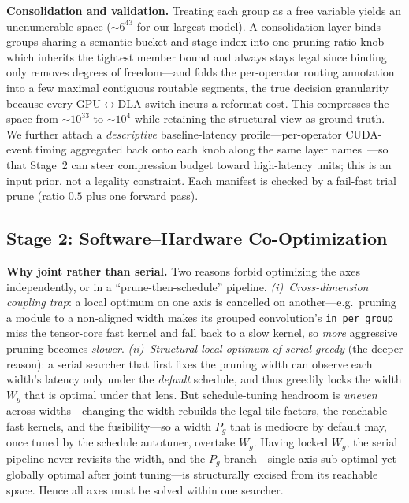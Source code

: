 \documentclass[letterpaper]{article} %
\begin{document}
\noindent\textbf{Consolidation and validation.}
Treating each group as a free variable yields an unenumerable space
($\sim 6^{43}$ for our largest model). A consolidation layer binds groups
sharing a semantic bucket and stage index into one pruning-ratio knob---which
inherits the tightest member bound and always stays legal since binding only
removes degrees of freedom---and folds the per-operator routing annotation
into a few maximal contiguous routable segments, the true decision
granularity because every GPU$\leftrightarrow$DLA switch incurs a reformat
cost. This compresses the space from $\sim 10^{33}$ to $\sim 10^{4}$ while
retaining the structural view as ground truth. We further attach a
\emph{descriptive} baseline-latency profile---per-operator CUDA-event timing
aggregated back onto each knob along the same layer names~\cite{yang2018netadapt}---so
that Stage~2 can steer compression budget toward high-latency units; this is
an input prior, not a legality constraint. Each manifest is checked by a
fail-fast trial prune (ratio $0.5$ plus one forward pass).

\subsection{Stage 2: Software--Hardware Co-Optimization}

\noindent\textbf{Why joint rather than serial.}
Two reasons forbid optimizing the axes independently, or in a
``prune-then-schedule'' pipeline. \emph{(i)~Cross-dimension coupling trap}:
a local optimum on one axis is cancelled on another---e.g.\ pruning a module
to a non-aligned width makes its grouped convolution's
\texttt{in\_per\_group} miss the tensor-core fast kernel and fall back to a
slow kernel, so \emph{more} aggressive pruning becomes \emph{slower}.
\emph{(ii)~Structural local optimum of serial greedy} (the deeper reason):
a serial searcher that first fixes the pruning width can observe each width's
latency only under the \emph{default} schedule, and thus greedily locks the
width $W_g$ that is optimal under that lens. But schedule-tuning headroom is
\emph{uneven} across widths---changing the width rebuilds the legal tile
factors, the reachable fast kernels, and the fusibility---so a width $P_g$
that is mediocre by default may, once tuned by the schedule
autotuner, overtake $W_g$. Having locked $W_g$, the serial pipeline never
revisits the width, and the $P_g$ branch---single-axis sub-optimal yet
globally optimal after joint tuning---is structurally excised from its
reachable space. Hence all axes must be solved within one searcher.
\end{document}
